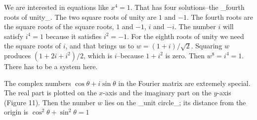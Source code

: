 We are interested in equations like \(x^{4}=1\). That has four solutions--the _fourth roots of unity_. The two square roots of unity are \(1\) and \(-1\). The fourth roots are the square roots of the square roots, \(1\) and \(-1\), \(i\) and \(-i\). The number \(i\) will satisfy \(i^{4}=1\) because it satisfies \(i^{2}=-1\). For the eighth roots of unity we need the square roots of \(i\), and that brings us to \(w=(1+i)/\sqrt{2}\). Squaring \(w\) produces \((1+2i+i^{2})/2\), which is \(i\)--because \(1+i^{2}\) is zero. Then \(w^{8}=i^{4}=1\). There has to be a system here.

The complex numbers \(\cos\theta+i\sin\theta\) in the Fourier matrix are extremely special. The real part is plotted on the \(x\)-axis and the imaginary part on the \(y\)-axis (Figure 11). Then the number \(w\) lies on the _unit circle_; its distance from the origin is \(\cos^{2}\theta+\sin^{2}\theta=1\) 